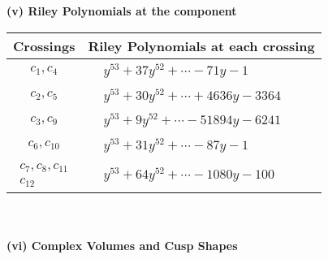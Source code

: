 \documentclass[1p]{elsarticle_modified}
\theoremstyle{definition}
\begin{document}
\newpage\renewcommand{\arraystretch}{1}
\flushleft \textbf{(v) Riley Polynomials at the component}\newline \\
\begin{tabular}{m{50pt}|m{274pt}}
Crossings & \hspace{64pt}Riley Polynomials at each crossing \\
\hline $$\begin{aligned}c_{1},c_{4}\end{aligned}$$&$\begin{aligned}
&y^{53}+37 y^{52}+\cdots-71 y-1
\end{aligned}$\\
\hline $$\begin{aligned}c_{2},c_{5}\end{aligned}$$&$\begin{aligned}
&y^{53}+30 y^{52}+\cdots+4636 y-3364
\end{aligned}$\\
\hline $$\begin{aligned}c_{3},c_{9}\end{aligned}$$&$\begin{aligned}
&y^{53}+9 y^{52}+\cdots-51894 y-6241
\end{aligned}$\\
\hline $$\begin{aligned}c_{6},c_{10}\end{aligned}$$&$\begin{aligned}
&y^{53}+31 y^{52}+\cdots-87 y-1
\end{aligned}$\\
\hline $$\begin{aligned}c_{7},c_{8},c_{11}\\c_{12}\end{aligned}$$&$\begin{aligned}
&y^{53}+64 y^{52}+\cdots-1080 y-100
\end{aligned}$\\
\hline
\end{tabular}\\~\\
\newpage\flushleft \textbf{(vi) Complex Volumes and Cusp Shapes}
\end{document}
